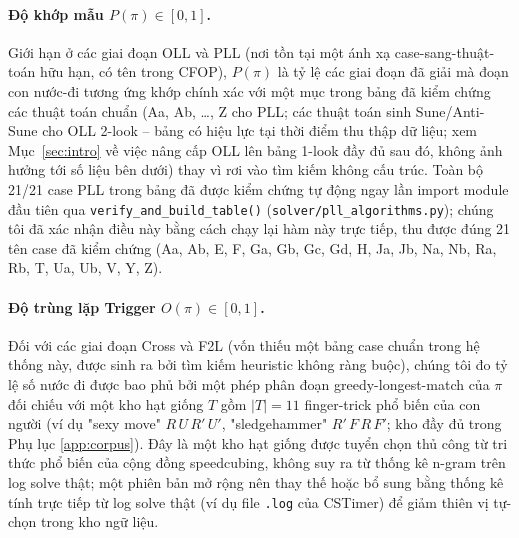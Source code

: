 \documentclass[10pt,conference]{article}
\begin{document}
\paragraph{Độ khớp mẫu $P(\pi) \in [0,1]$.}
\label{sec:hli-conformity}
Giới hạn ở các giai đoạn OLL và PLL (nơi tồn tại một ánh xạ
case-sang-thuật-toán hữu hạn, có tên trong CFOP), $P(\pi)$ là tỷ lệ các
giai đoạn đã giải mà đoạn con nước-đi tương ứng khớp chính xác với một
mục trong bảng đã kiểm chứng các thuật toán chuẩn (Aa, Ab, \ldots, Z
cho PLL; các thuật toán sinh Sune/Anti-Sune cho OLL 2-look -- bảng có
hiệu lực tại thời điểm thu thập dữ liệu; xem Mục~\ref{sec:intro} về
việc nâng cấp OLL lên bảng 1-look đầy đủ sau đó, không ảnh hưởng tới
số liệu bên dưới)
thay vì rơi
vào tìm kiếm không cấu trúc. Toàn bộ 21/21 case PLL trong bảng đã
được kiểm chứng tự động ngay lần import module đầu tiên qua
\texttt{verify\_and\_build\_table()}
(\texttt{solver/pll\_algorithms.py}); chúng tôi đã xác nhận điều này
bằng cách chạy lại hàm này trực tiếp, thu được đúng 21 tên case đã
kiểm chứng (Aa, Ab, E, F, Ga, Gb, Gc, Gd, H, Ja, Jb, Na, Nb, Ra, Rb,
T, Ua, Ub, V, Y, Z).

\paragraph{Độ trùng lặp Trigger $O(\pi) \in [0,1]$.}
\label{sec:hli-trigger}
Đối với các giai đoạn Cross và F2L (vốn thiếu một bảng case chuẩn trong
hệ thống này, được sinh ra bởi tìm kiếm heuristic không ràng buộc),
chúng tôi đo tỷ lệ số nước đi được bao phủ bởi một phép phân đoạn
greedy-longest-match của $\pi$ đối chiếu với một kho hạt giống $T$ gồm
$|T|=11$ finger-trick phổ biến của con người
\citep{jperm-fingertricks} (ví dụ "sexy move"
$R\,U\,R'\,U'$, "sledgehammer" $R'\,F\,R\,F'$; kho đầy đủ trong Phụ lục
\ref{app:corpus}). Đây là một kho hạt giống được tuyển chọn thủ công
từ tri thức phổ biến của cộng đồng speedcubing, không suy ra từ thống
kê n-gram trên log solve thật; một phiên bản mở rộng nên thay thế
hoặc bổ sung bằng thống kê tính trực tiếp từ log solve thật (ví dụ file
\texttt{.log} của CSTimer) để giảm thiên vị tự-chọn trong kho ngữ liệu.
\end{document}
